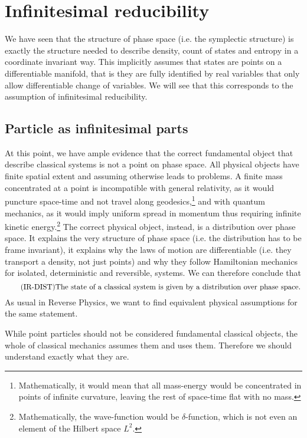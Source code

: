 \section{Infinitesimal reducibility}

We have seen that the structure of phase space (i.e. the symplectic structure) is exactly the structure needed to describe density, count of states and entropy in a coordinate invariant way. This implicitly assumes that states are points on a differentiable manifold, that is they are fully identified by real variables that only allow differentiable change of variables. We will see that this corresponds to the assumption of infinitesimal reducibility.

\subsection{Particle as infinitesimal parts}
At this point, we have ample evidence that the correct fundamental object that describe classical systems is not a point on phase space. All physical objects have finite spatial extent and assuming otherwise leads to problems. A finite mass concentrated at a point is incompatible with general relativity, as it would puncture space-time and not travel along geodesics,\footnote{Mathematically, it would mean that all mass-energy would be concentrated in points of infinite curvature, leaving the rest of space-time flat with no mass.} and with quantum mechanics, as it would imply uniform spread in momentum thus requiring infinite kinetic energy.\footnote{Mathematically, the wave-function would be $\delta$-function, which is not even an element of the Hilbert space $L^2$.} The correct physical object, instead, is a distribution over phase space. It explains the very structure of phase space (i.e. the distribution has to be frame invariant), it explains why the laws of motion are differentiable (i.e. they transport a density, not just points) and why they follow Hamiltonian mechanics for isolated, deterministic and reversible, systems. We can therefore conclude that
\begin{equation}\tag{IR-DIST}\label{rp-cm-ir-condDistributionOverPhaseSpace}
	\eqtext{The state of a classical system is given by a distribution over phase space.}
\end{equation}
As usual in Reverse Physics, we want to find equivalent physical assumptions for the same statement.

While point particles should not be considered fundamental classical objects, the whole of classical mechanics assumes them and uses them. Therefore we should understand exactly what they are.


